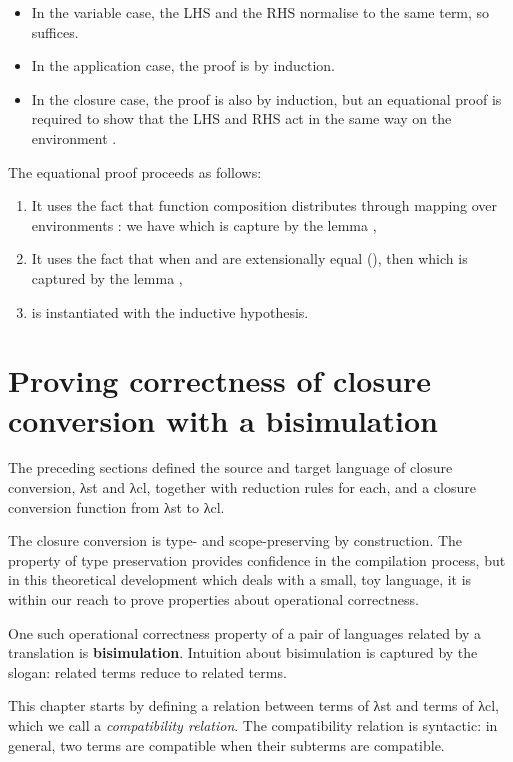 \documentclass[bsc,frontabs,oneside,singlespacing,parskip,deptreport]{infthesis}
\theoremstyle{definition}
\theoremstyle{lemma}
\begin{document}
\begin{itemize}
\item In the variable case, the LHS and the RHS normalise to the same
  term, so  suffices.
\item In the application case, the proof is by induction.
\item In the closure case, the proof is also by induction, but an
  equational proof is required to show that the LHS and RHS act in the
  same way on the environment .
\end{itemize}

The equational proof proceeds as follows:

\begin{enumerate}[nolistsep]
\item It uses the fact that function composition 
  distributes through mapping over environments \AS{\_<\$>\_}: we have
   which is capture by the lemma
  ,
\item It uses the fact that when  and  are extensionally
  equal (), then  which
  is captured by the lemma ,
\item {} is instantiated with the inductive hypothesis.
\end{enumerate}

\chapter{Proving correctness of closure conversion with a
  bisimulation} 
\label{cha:prov-corr-clos}

The preceding sections defined the source and target language of
closure conversion, λst and λcl, together with reduction rules for
each, and a closure conversion function  from λst to λcl.

The  closure conversion is type- and scope-preserving by
construction. The property of type preservation provides confidence in
the compilation process, but in this theoretical development which
deals with a small, toy language, it is within our reach to prove
properties about operational correctness.

One such operational correctness property of a pair of languages
related by a translation is \textbf{bisimulation}. Intuition about
bisimulation is captured by the slogan: related terms reduce to related
terms.

This chapter starts by defining a relation between terms of λst and
terms of λcl, which we call a \textit{compatibility relation}. The
compatibility relation is syntactic: in general, two terms are
compatible when their subterms are compatible.
\end{document}
